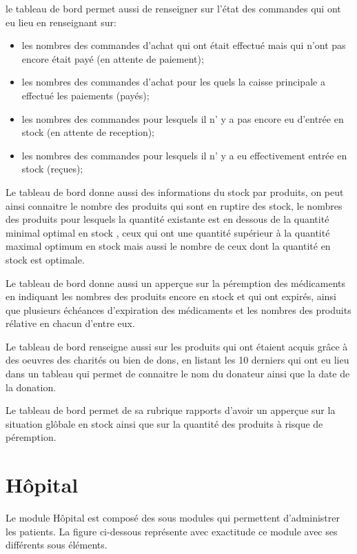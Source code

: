 \documentclass[12pt,a4paper]{report}
\begin{document}
le tableau de bord permet aussi de renseigner sur l'état des commandes qui ont eu lieu en renseignant sur:
\begin{itemize}
\item les nombres des commandes d'achat qui ont était effectué mais qui n'ont pas encore était payé (en attente de paiement);
\item les nombres des commandes d'achat pour les quels la caisse principale a effectué les paiements (payés);
\item les nombres des commandes pour lesquels il n' y a pas encore eu d'entrée en stock (en attente de reception);
\item les nombres des commandes pour lesquels il n' y a eu effectivement entrée en stock (reçues);
\end{itemize}

Le tableau de bord donne aussi des informations du stock par produits, on peut ainsi connaitre le nombre des produits qui sont en ruptire des stock, le nombres des produits pour lesquels la quantité existante est en dessous de la quantité minimal optimal en stock , ceux qui ont une quantité supérieur à la quantité maximal optimum en stock mais aussi le nombre de ceux dont la quantité en stock est optimale.

Le tableau de bord donne aussi un apperçue sur la péremption des médicaments en indiquant les nombres des produits encore en stock et qui ont expirés, ainsi que plusieurs échéances d'expiration des médicaments et les nombres des produits rélative en chacun d'entre eux.

Le tableau de bord renseigne aussi sur les produits qui ont étaient acquis grâce à des oeuvres des charités ou bien de dons, en listant les 10 derniers qui ont eu lieu dans un tableau qui permet de connaitre le nom du donateur ainsi que la date de la donation.

Le tableau de bord permet de sa rubrique rapports d'avoir un apperçue sur la situation glôbale en stock ainsi que sur la quantité des produits à risque de péremption.


\newpage
\chapter{Hôpital}        

Le module Hôpital est composé des sous modules qui permettent d'administrer les patients. La figure ci-dessous représente avec exactitude ce module avec ses différents sous éléments.
\end{document}
